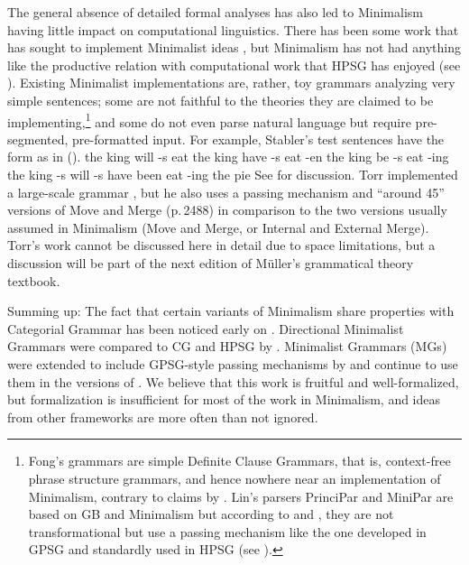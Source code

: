 \documentclass[output=paper
	        ,collection
	        ,collectionchapter
 	        ,biblatex
                ,babelshorthands
                ,newtxmath
                ,draftmode
                ,colorlinks, citecolor=brown
]{langscibook}
\begin{document}
The general absence of detailed formal analyses has also led to Minimalism having little impact on
computational linguistics. There has been some work that has sought to implement Minimalist ideas
\citep{Stabler2001a,FG2012a,Fong2014a}, but Minimalism has not had anything like the productive
relation with computational work that HPSG has enjoyed (see ). Existing Minimalist implementations are, rather, toy
grammars analyzing very simple sentences; some are not faithful to the theories they are claimed to
be implementing,\footnote{%
  Fong's grammars are simple Definite Clause Grammars, that is, context-free phrase structure grammars, and hence nowhere near an implementation of
  Minimalism, contrary to claims by \citet*[]{BPYC2011a}.
  Lin's parsers PrinciPar and MiniPar \citeyearpar{Lin93a,Lin2003a-u} are based on GB and Minimalism
  but according to \citet[]{Lin93a} and \citet[]{TSSC2019a}, they
  are not transformational but use a \slasch passing mechanism like the one developed in GPSG
  \citep{Gazdar81a} and standardly used in HPSG (see ).
} and some do not even parse natural language but require pre-segmented, pre-formatted
input. For example, Stabler's test sentences have the form as in ().
\eal
\ex the king will -s eat
\ex the king have -s eat -en
\ex the king be -s eat -ing
\ex the king -s will -s have been eat -ing the pie
\zl
See \citet[Section~4.7.2]{MuellerGT-Eng3} for discussion. Torr implemented a large-scale grammar
\citep[]{TSSC2019a}, but he also uses a \slasch passing mechanism and ``around 45''
versions of Move and Merge (p.\,2488) in comparison to the two versions usually assumed in
Minimalism (Move and Merge, or Internal and External Merge). Torr's work cannot be discussed here in 
detail due to space limitations, but a discussion will be part of the next edition of Müller's
grammatical theory textbook.


Summing up: The fact that certain variants of Minimalism share properties with Categorial Grammar
has been noticed early on \citep{BE95a}. Directional Minimalist Grammars were compared to CG and HPSG
by \citet{MuellerUnifying}. Minimalist Grammars (MGs) were extended to include GPSG-style \slasch passing mechanisms by
\citet{Kobele2008a} and continue to use them in the versions of \citet{TS2016a}. We believe that
this work is fruitful and well-formalized, but formalization is insufficient for most of the work in
Minimalism, and ideas from other frameworks are more often than not ignored.
\end{document}
